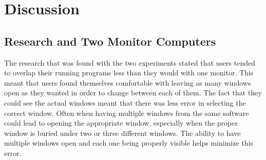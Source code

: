 \documentclass[11pt]{article}
\begin{document}
\section{Discussion}
\subsection{Research and Two Monitor Computers}
The research that was found with the two experiments stated that users tended to overlap their running programs less than they would with one monitor. This meant that users found themselves comfortable with leaving as many windows open as they wanted in order to change between each of them. The fact that they could see the actual windows meant that there was less error in selecting the correct window. Often when having multiple windows from the same software could lead to opening the appropriate window, especially when the proper window is buried under two or three different windows. The ability to have multiple windows open and each one being properly visible helps minimize this error. 
\end{document}
